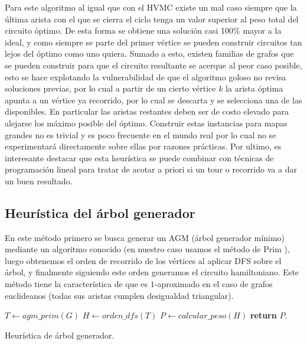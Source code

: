 \documentclass[10pt,a4paper]{article}
\begin{document}
Para este algoritmo al igual que con el HVMC existe un mal caso siempre que la última arista con el que se cierra el ciclo tenga un valor superior al peso total del circuito óptimo. De esta forma se obtiene una solución casi 100\% mayor a la ideal, y como siempre se parte del primer vértice se pueden construir circuitos tan lejos del óptimo como uno quiera. Sumado a esto, existen familias de grafos que se pueden construir para que el circuito resultante se acerque al peor caso posible, esto se hace explotando la vulnerabilidad de que el algoritmo goloso no revisa soluciones previas, por lo cual a partir de un cierto vértice $k$ la arista óptima apunta a un vértice ya recorrido, por lo cual se descarta y se selecciona una de las disponibles. En particular las aristas restantes deben ser de costo elevado para alejarse los máximo posible del óptimo. Construir estas instancias para mapas grandes no es trivial y es poco frecuente en el mundo real por lo cual no se experimentará directamente sobre ellas por razones prácticas. Por ultimo, es interesante destacar que esta heurística se puede combinar con técnicas de programación lineal para tratar de acotar a priori si un tour o recorrido va a dar un buen resultado.\cite{teo:pe}

\subsection{Heurística del árbol generador} \label{sec:hagm}
En este método primero se busca generar un AGM (árbol generador mínimo) mediante un algoritmo conocido (en nuestro caso usamos el método de Prim \cite{teo:Arboles}), luego obtenemos el orden de recorrido de los vértices al aplicar DFS \cite{teo:Arboles} sobre el árbol, y finalmente siguiendo este orden generamos el circuito hamiltoniano.
Este método tiene la característica de que es $1$-aproximado en el caso de grafos euclideanos (todas sus aristas cumplen desigualdad triangular).

\begin{algorithm}
	\begin{algorithmic}[1]
		
		\State $T \leftarrow agm\_prim(G)$ 
		\State $H \leftarrow orden\_dfs(T)$ 
		\State $P \leftarrow calcular\_peso(H)$ 
		\State \textbf{return} $P$.

		\EndFunction
	\end{algorithmic}
	\caption{Heurística de árbol generador.}
	\label{alg:hagm}
\end{algorithm} 	
\end{document}
